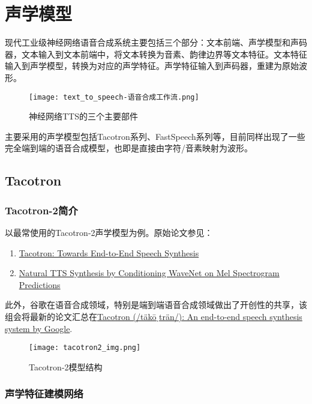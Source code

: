 \documentclass[cn,10pt,math=newtx,citestyle=gb7714-2015,bibstyle=gb7714-2015]{elegantbook}
\begin{document}
\chapter{声学模型}

现代工业级神经网络语音合成系统主要包括三个部分：文本前端、声学模型和声码器，文本输入到文本前端中，将文本转换为音素、韵律边界等文本特征。文本特征输入到声学模型，转换为对应的声学特征。声学特征输入到声码器，重建为原始波形。

\begin{figure}[htbp]
  \centering
  \texttt{[image: text\_to\_speech-语音合成工作流.png]}
  \caption{神经网络TTS的三个主要部件 \label{fig:main_components_in_tts}}
\end{figure}

主要采用的声学模型包括Tacotron系列、FastSpeech系列等，目前同样出现了一些完全端到端的语音合成模型，也即是直接由字符/音素映射为波形。

\section{Tacotron}

\subsection{Tacotron-2简介}

以最常使用的Tacotron-2声学模型为例。原始论文参见：

\begin{enumerate}
  \item \href{https://arxiv.org/abs/1703.10135}{Tacotron: Towards End-to-End Speech Synthesis}
  \item \href{https://arxiv.org/abs/1712.05884}{Natural TTS Synthesis by Conditioning WaveNet on Mel Spectrogram Predictions}
\end{enumerate}

此外，谷歌在语音合成领域，特别是端到端语音合成领域做出了开创性的共享，该组会将最新的论文汇总在\href{https://google.github.io/tacotron/}{Tacotron (/täkōˌträn/): An end-to-end speech synthesis system by Google}.

\begin{figure}[htbp]
  \centering
  \texttt{[image: tacotron2\_img.png]}
  \caption{Tacotron-2模型结构 \label{fig:tacotron2}}
\end{figure}

\subsection{声学特征建模网络}
\end{document}
